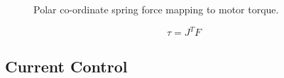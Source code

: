\begin{figure}
\centering
{}

\caption{Polar co-ordinate spring force mapping to motor torque.}
\label{fig:Polar co-ordinate spring force mapping to motor torque}
\end{figure}

\begin{equation}
\tau = J^TF
\end{equation}

\subsection{Current Control}
\label{sec:Current Control}


